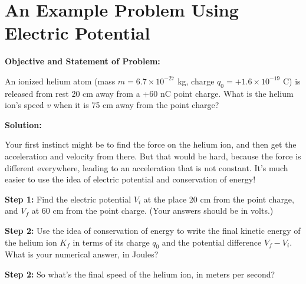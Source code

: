 \section{An Example Problem Using Electric Potential}

\begin{comment}
This lab is really just a worksheet I've used in my 132 class. --Matt Trawick, 6/2015
\end{comment}

\makelabheader %

\vspace{0.1in}
\textbf{Objective and Statement of Problem:}
 
An ionized helium atom (mass $m=6.7\times 10^{-27}$ kg, charge $q_0=+1.6\times 10^{-19}$ C) is released from rest 20 cm away from a +60 nC point charge.  What is the helium ion's speed $v$ when it is 75 cm away from the point charge?

\textbf{Solution:}

Your first instinct might be to find the force on the helium ion, and then get the acceleration and velocity from there.  But that would be hard, because the force is different everywhere, leading to an acceleration that is not constant.  It's much easier to use the idea of electric potential and conservation of energy!

\vspace{0.1in}

\textbf{Step 1:} \newline
Find the electric potential $V_i$ at the place 20 cm from the point charge, and $V_f$ at 60 cm from the point charge.  (Your answers should be in volts.)
\vspace{1.9in}


\textbf{Step 2:} \newline
Use the idea of conservation of energy to write the final kinetic energy of the helium ion $K_f$ in terms of its charge $q_0$ and the potential difference $V_f-V_i$.  What is your numerical answer, in Joules?
\vspace{1.6in}


\textbf{Step 2:} \newline
So what's the final speed of the helium ion, in meters per second?
\vspace{1.6in}
